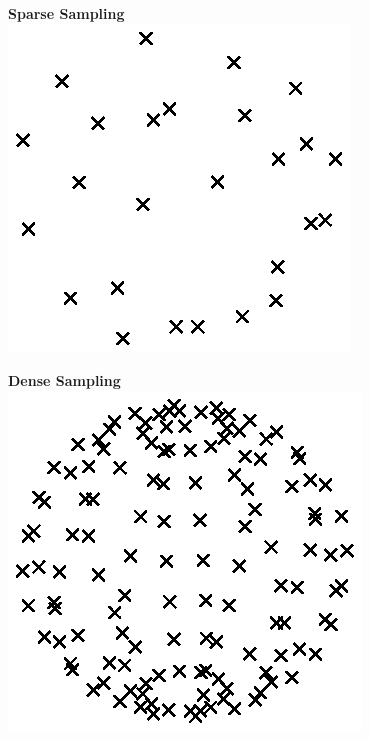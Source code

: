 \documentclass[authoryear,preprint,12pt]{elsarticle}
\begin{document}
\begin{figure}[tbp]
  \begin{center}
    \begin{minipage}[]{0.45\textwidth}
      \centering
      \textbf{Sparse Sampling}\\
      \includegraphics[width=\textwidth]{cloudlowden.eps}
    \end{minipage}
    \begin{minipage}[]{0.45\textwidth}
      \centering
      \textbf{Dense Sampling}\\
      \includegraphics[width=\textwidth]{cloudhighden.eps}

\end{minipage}
\end{center}
\end{figure}
\end{document}
